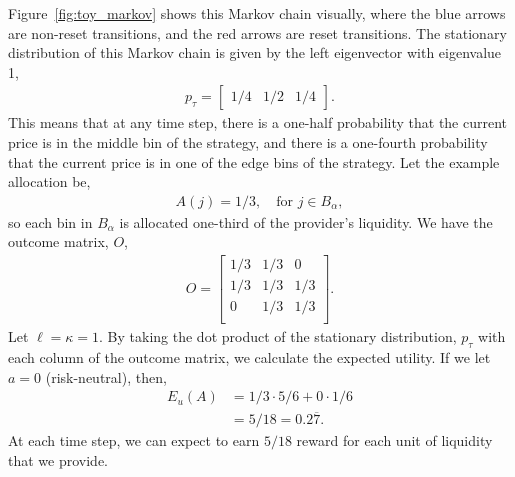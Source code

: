 \documentclass[sigconf, usenames, dvipsnames]{acmart}
\newcommand{\dcp}[1]{\textcolor{blue}{{\scriptsize{David:}}#1}}
\begin{document}
Figure~\ref{fig:toy_markov} shows this Markov chain visually, where the blue arrows are non-reset transitions, and the red arrows are reset transitions. The stationary distribution of this Markov chain is given by the left eigenvector with eigenvalue 1,
\begin{align*}
    p_{\tau} = 
    \begin{bmatrix}
    1/4 & 1/2 & 1/4
    \end{bmatrix}.
\end{align*}
This means that at any time step, there is a one-half probability that the current price is in the middle bin of the strategy, and there is a one-fourth probability that the current price is in one of the edge bins of the strategy. Let the example allocation be,
\begin{align*}\label{eq:toy_allocation}
    A(j) = 1/3, \quad \textrm{for } j \in B_{\alpha},
\end{align*}
so each bin in $B_{\alpha}$ is allocated one-third of the provider's liquidity. We have the outcome matrix, $O$,
\begin{align*}
    O = 
    \begin{bmatrix}
    1/3 & 1/3 & 0 \\ 
    1/3 & 1/3 & 1/3 \\ 
    0 & 1/3 & 1/3\\
    \end{bmatrix}.
\end{align*}
Let $\ell = \kappa = 1$. By taking the dot product of the stationary distribution, $p_{\tau}$ with each column of the outcome matrix, we calculate the expected utility.
If we let $a=0$ (risk-neutral), then,
\begin{align*}
    E_u(A) &= 1/3 \cdot 5/6 + 0 \cdot 1/6 \\
    &= 5/18 = 0.2\overline{7}.
\end{align*}
At each time step, we can expect to earn $5/18$ reward for each unit of liquidity that we provide.

\end{document}
